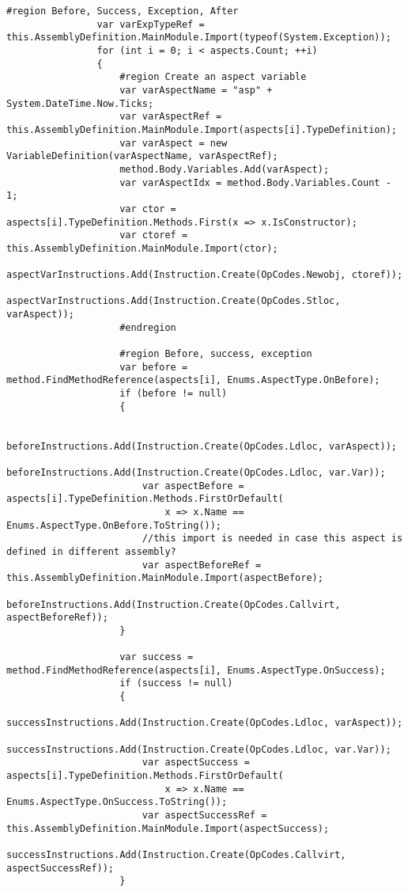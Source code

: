 \begin{lstlisting}[caption={../buffalo/Injectors/MethodBoundaryInjector.cs}, label=../buffalo/Injectors/MethodBoundaryInjector.cs, frame=tb, basicstyle=\scriptsize]
                #region Before, Success, Exception, After
                var varExpTypeRef = this.AssemblyDefinition.MainModule.Import(typeof(System.Exception));
                for (int i = 0; i < aspects.Count; ++i)
                {
                    #region Create an aspect variable
                    var varAspectName = "asp" + System.DateTime.Now.Ticks;
                    var varAspectRef = this.AssemblyDefinition.MainModule.Import(aspects[i].TypeDefinition);
                    var varAspect = new VariableDefinition(varAspectName, varAspectRef);
                    method.Body.Variables.Add(varAspect);
                    var varAspectIdx = method.Body.Variables.Count - 1;
                    var ctor = aspects[i].TypeDefinition.Methods.First(x => x.IsConstructor);
                    var ctoref = this.AssemblyDefinition.MainModule.Import(ctor);
                    aspectVarInstructions.Add(Instruction.Create(OpCodes.Newobj, ctoref));
                    aspectVarInstructions.Add(Instruction.Create(OpCodes.Stloc, varAspect));
                    #endregion

                    #region Before, success, exception
                    var before = method.FindMethodReference(aspects[i], Enums.AspectType.OnBefore);
                    if (before != null)
                    {

                        beforeInstructions.Add(Instruction.Create(OpCodes.Ldloc, varAspect));
                        beforeInstructions.Add(Instruction.Create(OpCodes.Ldloc, var.Var));
                        var aspectBefore = aspects[i].TypeDefinition.Methods.FirstOrDefault(
                            x => x.Name == Enums.AspectType.OnBefore.ToString());
                        //this import is needed in case this aspect is defined in different assembly?
                        var aspectBeforeRef = this.AssemblyDefinition.MainModule.Import(aspectBefore);
                        beforeInstructions.Add(Instruction.Create(OpCodes.Callvirt, aspectBeforeRef));
                    }

                    var success = method.FindMethodReference(aspects[i], Enums.AspectType.OnSuccess);
                    if (success != null)
                    {
                        successInstructions.Add(Instruction.Create(OpCodes.Ldloc, varAspect));
                        successInstructions.Add(Instruction.Create(OpCodes.Ldloc, var.Var));
                        var aspectSuccess = aspects[i].TypeDefinition.Methods.FirstOrDefault(
                            x => x.Name == Enums.AspectType.OnSuccess.ToString());
                        var aspectSuccessRef = this.AssemblyDefinition.MainModule.Import(aspectSuccess);
                        successInstructions.Add(Instruction.Create(OpCodes.Callvirt, aspectSuccessRef));
                    }


\end{lstlisting}
